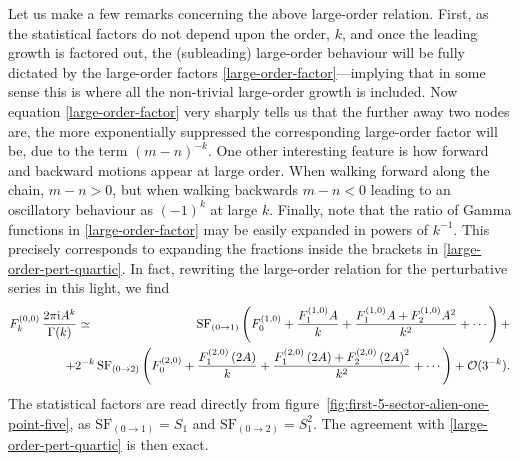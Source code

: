 \documentclass[11pt,a4paper]{article}
\newcommand{\rmi}{{\mathrm{i}}}
\begin{document}
Let us make a few remarks concerning the above large-order relation. First, as the statistical factors do not depend upon the order, $k$, and once the leading growth is factored out, the (subleading) large-order behaviour will be fully dictated by the large-order factors \eqref{large-order-factor}---implying that in some sense this is where all the non-trivial large-order growth is included. Now equation \eqref{large-order-factor} very sharply tells us that the further away two nodes are, the more exponentially suppressed the corresponding large-order factor will be, due to the term $\left( m-n \right)^{-k}$. One other interesting feature is how forward and backward motions appear at large order. When walking forward along the chain, $m-n>0$, but when walking backwards $m-n<0$ leading to an oscillatory behaviour as $(-1)^k$ at large $k$. Finally, note that the ratio of Gamma functions in \eqref{large-order-factor} may be easily expanded in powers of $k^{-1}$. This precisely corresponds to expanding the fractions inside the brackets in \eqref{large-order-pert-quartic}. In fact, rewriting the large-order relation for the perturbative series in this light, we find
%
\begin{eqnarray}
\label{large-order-pert-quartic-2}
F_{k}^{(0,0)}\, \frac{2\pi\rmi A^k}{\Gamma(k)} &\simeq& \mathrm{SF}_{(0\rightarrow1)} \left( F_0^{(1,0)} + \frac{F_1^{(1,0)} A}{k} + \frac{F_1^{(1,0)} A + F_2^{(1,0)} A^2}{k^2} + \cdots \right) + \\
&&
\hspace{-30pt}
+ 2^{-k}\, \mathrm{SF}_{(0\rightarrow2)} \left( F_0^{(2,0)} + \frac{F_1^{(2,0)} \left( 2A \right)}{k} + \frac{F_1^{(2,0)} \left( 2A \right) + F_2^{(2,0)} \left( 2A \right)^2}{k^2} + \cdots \right) + \mathcal{O}(3^{-k}). \nonumber
\end{eqnarray}
%
\noindent
The statistical factors are read directly from figure~\ref{fig:first-5-sector-alien-one-point-five}, as $\mathrm{SF}_{(0\rightarrow1)} = S_1$ and $\mathrm{SF}_{(0\rightarrow2)} = S_1^2$. The agreement with \eqref{large-order-pert-quartic} is then exact.
\end{document}
